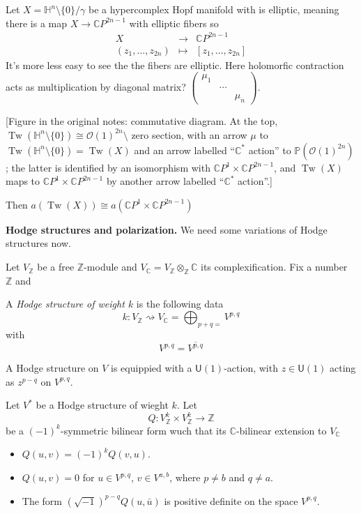 Let $X=\mathbb{H}^n\setminus \{0\} /\gamma$
be a hypercomplex Hopf manifold with is
elliptic, meaning there is a map $X\to
\mathbb{C}P^{2n-1}$ with elliptic fibers so
$$
\begin{array}{rcl}
X & \longrightarrow & \mathbb{C}P^{2n-1} \\
(z_1,\ldots,z_{2n}) & \longmapsto &
[z_1,\ldots,z_{2n}]
\end{array}
$$
It's more less easy to see the the fibers are
elliptic. Here holomorfic contraction acts as
multiplication by diagonal matrix?
$\begin{pmatrix} \mu_1&& \\& \cdots &
\\&&\mu_{n}\end{pmatrix}$.

[Figure in the original notes: commutative
diagram. At the top,
$\operatorname{Tw}(\mathbb{H}^n\setminus
\{0\})\cong \mathcal{O}(1)^{2n}\setminus$
zero section, with an arrow $\mu$ to
$\operatorname{Tw}(\mathbb{H}^n\setminus
\{0\})=\operatorname{Tw}(X)$ and an arrow
labelled ``$\mathbb{C}^*$ action'' to
$\mathbb{P}(\mathcal{O}(1)^{2n})$; the latter
is identified by an isomorphism with
$\mathbb{C}P^{1}\times \mathbb{C}P^{2n-1}$,
and $\operatorname{Tw}(X)$ maps to
$\mathbb{C}P^{1}\times \mathbb{C}P^{2n-1}$ by
another arrow labelled ``$\mathbb{C}^*$
action''.]

Then $a(\operatorname{Tw}(X))\cong
a(\mathbb{C}P^{1}\times \mathbb{C}P^{2n-1})$

\medskip\noindent
{\bf Hodge structures and polarization.}
We need some variations of Hodge structures
now.

Let $V_{\mathbb{Z}}$ be a free
$\mathbb{Z}$-module and
$V_{\mathbb{C}}=V_{\mathbb{Z}}
\otimes_{\mathbb{Z}}\mathbb{C}$
its complexification. Fix a number
$\mathbb{Z}$ and

\begin{definition}
\label{definition-tw-hodge-structure}
A {\it Hodge structure of weight $k$} is the
following data
$$
k:V_\mathbb{Z}\rightsquigarrow
V_{\mathbb{C}}=\bigoplus_{p+q=}  V^{p,q}
$$
with
$$
V^{p,q}=\overline{V^{p,q}}
$$
\end{definition}

A Hodge structure on $V$ is equippied with a
$\mathsf{U}(1)$-action, with
$z\in\mathsf{U}(1)$ acting as $z^{p-q}$ on
$V^{p,q}$.

\begin{definition}
\label{definition-tw-polarization}
Let $V^*$ be a Hodge structure of wieght $k$.
Let
$$
Q:V_\mathbb{Z}^k\times V_{\mathbb{Z}}^k\to
\mathbb{Z}
$$
be a $(-1)^{k}$-symmetric bilinear form wuch
that its $\mathbb{C}$-bilinear extension to
$V_\mathbb{C}$
\begin{itemize}
\item $Q(u,v)=(-1)^{k} Q(v,u)$.
\item $Q(u,v)=0$ for $u\in V^{p,q}$, $v\in
V^{a,b}$, where $p\neq b$ and $q\neq a$.
\item The form $(\sqrt{-1})^{p-q}
Q(u,\bar{u})$ is positive definite on the
space $V^{p,q}$.
\end{itemize}
\end{definition}

